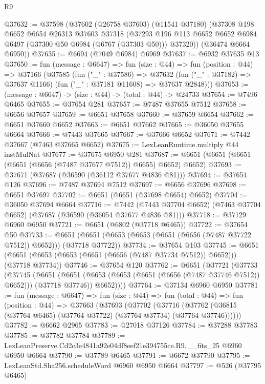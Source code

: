 \begin{lexlean}{R9}
\begin{coremodule}
@37632 := @37598
    (@37602
      (@26758 @37603)
      (@11541 @37180)
      (@37308
        @198
        @6652
        @6654
        @26313
        @37603
        @37318
        (@37293 @196 @113 @6652 @6652 @6984 @6497 (@37300 @50 @6984 (@6767 (@37303 @50))) @37320))
      (@36474 @6664 @6950))
@37635 := @6694 (@7049 @6984) @6969
@37637 := @6932 @37635 @13
@37650 := fun (message : @6647) =>
  fun (size : @44) =>
  fun (position : @44) =>
  @37166
    (@37585
      (fun ("_" : @37586) =>
      @37632 (fun ("_" : @37182) => @37637 @1166) (fun ("_" : @37181 @11608) => @37637 @2848)))
@37653 := (message : @6647) -> (size : @44) -> (total : @44) -> @24733
@37654 := @7496 @6465
@37655 := @37654 @281
@37657 := @7487 @37655 @7512
@37658 := @6656 @37657
@37659 := @6651 @37658
@37660 := @37659 @6654
@37662 := @6651 @37660 @6652
@37663 := @6651 @37662
@37665 := @36050 @37655 @6664
@37666 := @7443 @37665
@37667 := @37666 @6652
@37671 := @7442 @37667 (@7463 @37665 @6652)
@37675 := LexLeanRuntime.multiply @44 instMulNat
@37677 := @37675 @6950 @281
@37687 := @6651 (@6651 (@6651 (@6651 (@6656 (@7487 @37677 @7512)) @6655) @6652) @6652)
@37693 := @37671 (@37687 (@36590 (@36112 @37677 @4836 @81)))
@37694 := @37654 @126
@37696 := @7487 @37694 @7512
@37697 := @6656 @37696
@37698 := @6651 @37697
@37702 := @6651 (@6651 (@37698 @6654) @6652)
@37704 := @36050 @37694 @6664
@37716 := @7442
    (@7443 @37704 @6652)
    (@7463 @37704 @6652)
    (@37687 (@36590 (@36054 @37677 @4836 @81)))
@37718 := @37129 @6960 @6950
@37721 := @6651 (@6802 (@37718 @6465))
@37722 := @37654 @50
@37733 := @6651 (@6651 (@6653 (@6653 (@6651 (@6656 (@7487 @37722 @7512)) @6652))) (@37718 @37722))
@37734 := @37654 @103
@37745 := @6651 (@6651 (@6653 (@6653 (@6651 (@6656 (@7487 @37734 @7512)) @6652))) (@37718 @37734))
@37746 := @37654 @120
@37762 := @6651
    (@37721
      (@37733
        (@37745
          (@6651
            (@6651 (@6653 (@6653 (@6651 (@6656 (@7487 @37746 @7512)) @6652))) (@37718 @37746))
            @6652))))
@37764 := @37134 @6960 @6950
@37781 := fun (message : @6647) =>
  fun (size : @44) =>
  fun (total : @44) =>
  fun (position : @44) =>
  @37663
    (@37693
      (@37702
        (@37716 (@37762 (@36815 (@37764 @6465) (@37764 @37722) (@37764 @37734) (@37764 @37746))))))
@37782 := @6662 @2965
@37783 := @27018 @37126
@37784 := @37288 @37783
@37785 := @37782 @37784
@37789 := LexLeanPreserve.Cd2c3e4841a92e04df8eef21e394755ce.R9.__fits_25 @6960 @6950 @6664
@37790 := @37789 @6465
@37791 := @6672 @37790
@37795 := LexLeanStd.Sha256.scheduleWord @6960 @6950 @6664
@37797 := @526 (@37795 @6465)

\end{coremodule}
\end{lexlean}
